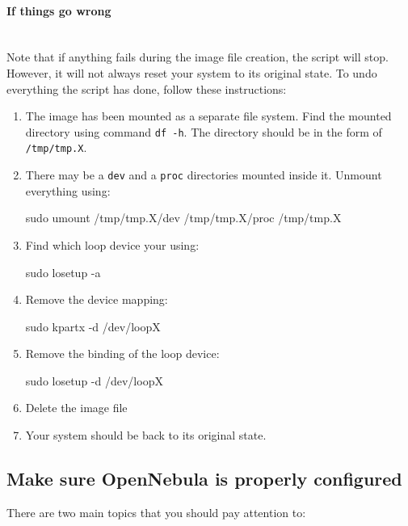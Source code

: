 \documentclass[10pt]{article}
\begin{document}
\paragraph{If things go wrong}~\\

Note that if anything fails during the image file creation, the script
will stop. However, it will not always reset your system to its
original state. To undo everything the script has done, follow these
instructions:

\begin{enumerate}
\item The image has been mounted as a separate file system. Find the
  mounted directory using command \verb+df -h+. The directory should
  be in the form of \verb+/tmp/tmp.X+.
  
\item There may be a \verb+dev+ and a \verb+proc+ directories mounted
  inside it. Unmount everything using:
  \begin{code}
    sudo umount /tmp/tmp.X/dev /tmp/tmp.X/proc /tmp/tmp.X
  \end{code}
  
\item Find which loop device your using:
  \begin{code}
    sudo losetup -a
  \end{code}
  
\item Remove the device mapping:
  \begin{code}
    sudo kpartx -d /dev/loopX
  \end{code}
  
\item Remove the binding of the loop device:
  \begin{code}
    sudo losetup -d /dev/loopX
  \end{code}

\item Delete the image file 

\item Your system should be back to its original state.
\end{enumerate}

\subsection{Make sure OpenNebula is properly configured}

There are two main topics that you should pay attention to:
\end{document}
